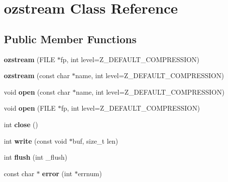 \hypertarget{classozstream}{}\section{ozstream Class Reference}
\label{classozstream}
\subsection*{Public Member Functions}
\begin{DoxyCompactItemize}
\item 
\mbox{\label{classozstream_add8c121cdb4538f9f2de2d517c640e61}} 
{\bfseries ozstream} (F\+I\+LE $\ast$fp, int level=Z\+\_\+\+D\+E\+F\+A\+U\+L\+T\+\_\+\+C\+O\+M\+P\+R\+E\+S\+S\+I\+ON)
\item 
\mbox{\label{classozstream_af30abfcf07fef0000c7fd3e4ab89eb85}} 
{\bfseries ozstream} (const char $\ast$name, int level=Z\+\_\+\+D\+E\+F\+A\+U\+L\+T\+\_\+\+C\+O\+M\+P\+R\+E\+S\+S\+I\+ON)
\item 
\mbox{\label{classozstream_aea598e6f8f3bb1ffff903546d98b14f0}} 
void {\bfseries open} (const char $\ast$name, int level=Z\+\_\+\+D\+E\+F\+A\+U\+L\+T\+\_\+\+C\+O\+M\+P\+R\+E\+S\+S\+I\+ON)
\item 
\mbox{\label{classozstream_aa5ccfff4546c31dd1f9cd78ad02d446f}} 
void {\bfseries open} (F\+I\+LE $\ast$fp, int level=Z\+\_\+\+D\+E\+F\+A\+U\+L\+T\+\_\+\+C\+O\+M\+P\+R\+E\+S\+S\+I\+ON)
\item 
\mbox{\label{classozstream_a1f5bf09289fa67b17e768435cf4f01f1}} 
int {\bfseries close} ()
\item 
\mbox{\label{classozstream_a2dbcc101aa6e94eb2ca866e9b8db4c84}} 
int {\bfseries write} (const void $\ast$buf, size\+\_\+t len)
\item 
\mbox{\label{classozstream_a0fc1b5181044b8d6b6aed0381e8f449c}} 
int {\bfseries flush} (int \+\_\+flush)
\item 
\mbox{\label{classozstream_a189c85676e712ba4776bb17e1de22388}} 
const char $\ast$ {\bfseries error} (int $\ast$errnum)
\item 

\end{DoxyCompactItemize}

